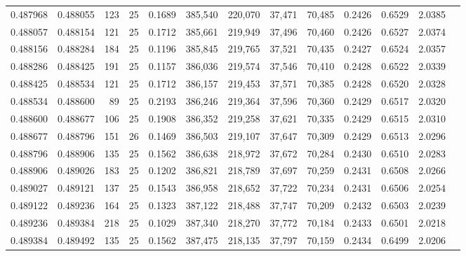 \begin{tabular}{rrrrrrrrrrrrr}
0.487968 & 0.488055 &   123 &  25 &                                     0.1689 & 385,540 & 220,070 &  37,471 &  70,485 & 0.2426 & 0.6529 & 2.0385 \\
0.488057 & 0.488154 &   121 &  25 &                                     0.1712 & 385,661 & 219,949 &  37,496 &  70,460 & 0.2426 & 0.6527 & 2.0374 \\
0.488156 & 0.488284 &   184 &  25 &                                     0.1196 & 385,845 & 219,765 &  37,521 &  70,435 & 0.2427 & 0.6524 & 2.0357 \\
0.488286 & 0.488425 &   191 &  25 &                                     0.1157 & 386,036 & 219,574 &  37,546 &  70,410 & 0.2428 & 0.6522 & 2.0339 \\
0.488425 & 0.488534 &   121 &  25 &                                     0.1712 & 386,157 & 219,453 &  37,571 &  70,385 & 0.2428 & 0.6520 & 2.0328 \\
0.488534 & 0.488600 &    89 &  25 &                                     0.2193 & 386,246 & 219,364 &  37,596 &  70,360 & 0.2429 & 0.6517 & 2.0320 \\
0.488600 & 0.488677 &   106 &  25 &                                     0.1908 & 386,352 & 219,258 &  37,621 &  70,335 & 0.2429 & 0.6515 & 2.0310 \\
0.488677 & 0.488796 &   151 &  26 &                                     0.1469 & 386,503 & 219,107 &  37,647 &  70,309 & 0.2429 & 0.6513 & 2.0296 \\
0.488796 & 0.488906 &   135 &  25 &                                     0.1562 & 386,638 & 218,972 &  37,672 &  70,284 & 0.2430 & 0.6510 & 2.0283 \\
0.488906 & 0.489026 &   183 &  25 &                                     0.1202 & 386,821 & 218,789 &  37,697 &  70,259 & 0.2431 & 0.6508 & 2.0266 \\
0.489027 & 0.489121 &   137 &  25 &                                     0.1543 & 386,958 & 218,652 &  37,722 &  70,234 & 0.2431 & 0.6506 & 2.0254 \\
0.489122 & 0.489236 &   164 &  25 &                                     0.1323 & 387,122 & 218,488 &  37,747 &  70,209 & 0.2432 & 0.6503 & 2.0239 \\
0.489236 & 0.489384 &   218 &  25 &                                     0.1029 & 387,340 & 218,270 &  37,772 &  70,184 & 0.2433 & 0.6501 & 2.0218 \\
0.489384 & 0.489492 &   135 &  25 &                                     0.1562 & 387,475 & 218,135 &  37,797 &  70,159 & 0.2434 & 0.6499 & 2.0206 \\

\end{tabular}
